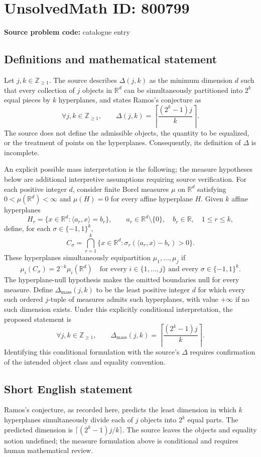 \documentclass[11pt]{article}
\newcommand{\Z}{\mathbb{Z}}
\newcommand{\R}{\mathbb{R}}
\begin{document}
\section*{UnsolvedMath ID: 800799}
\textbf{Source problem code:} catalogue entry
\subsection{Definitions and mathematical statement}
Let \(j,k\in\Z_{\ge 1}\). The source describes \(\Delta(j,k)\) as the minimum dimension \(d\) such that every collection of \(j\) objects in \(\R^d\) can be simultaneously partitioned into \(2^k\) equal pieces by \(k\) hyperplanes, and states Ramos's conjecture as
\[
\forall j,k\in\Z_{\ge 1},\qquad
\Delta(j,k)=\left\lceil\frac{(2^k-1)j}{k}\right\rceil.
\]
The source does not define the admissible objects, the quantity to be equalized, or the treatment of points on the hyperplanes. Consequently, its definition of \(\Delta\) is incomplete.

An explicit possible mass interpretation is the following; the measure hypotheses below are additional interpretive assumptions requiring source verification. For each positive integer \(d\), consider finite Borel measures \(\mu\) on \(\R^d\) satisfying \(0<\mu(\R^d)<\infty\) and \(\mu(H)=0\) for every affine hyperplane \(H\). Given \(k\) affine hyperplanes
\[
H_r=\{x\in\R^d:\langle a_r,x\rangle=b_r\},\qquad
 a_r\in\R^d\setminus\{0\},\quad b_r\in\R,\quad 1\le r\le k,
\]
define, for each \(\sigma\in\{-1,1\}^k\),
\[
C_\sigma=\bigcap_{r=1}^k
\{x\in\R^d:\sigma_r(\langle a_r,x\rangle-b_r)>0\}.
\]
These hyperplanes simultaneously equipartition \(\mu_1,\ldots,\mu_j\) if
\[
\mu_i(C_\sigma)=2^{-k}\mu_i(\R^d)
\quad\text{for every }i\in\{1,\ldots,j\}
\text{ and every }\sigma\in\{-1,1\}^k.
\]
The hyperplane-null hypothesis makes the omitted boundaries null for every measure. Define \(\Delta_{\mathrm{mass}}(j,k)\) to be the least positive integer \(d\) for which every such ordered \(j\)-tuple of measures admits such hyperplanes, with value \(+\infty\) if no such dimension exists. Under this explicitly conditional interpretation, the proposed statement is
\[
\forall j,k\in\Z_{\ge1},\qquad
\Delta_{\mathrm{mass}}(j,k)=
\left\lceil\frac{(2^k-1)j}{k}\right\rceil.
\]
Identifying this conditional formulation with the source's \(\Delta\) requires confirmation of the intended object class and equality convention.
\subsection{Short English statement}
Ramos's conjecture, as recorded here, predicts the least dimension in which \(k\) hyperplanes simultaneously divide each of \(j\) objects into \(2^k\) equal parts. The predicted dimension is \(\lceil(2^k-1)j/k\rceil\). The source leaves the objects and equality notion undefined; the measure formulation above is conditional and requires human mathematical review.
\end{document}
